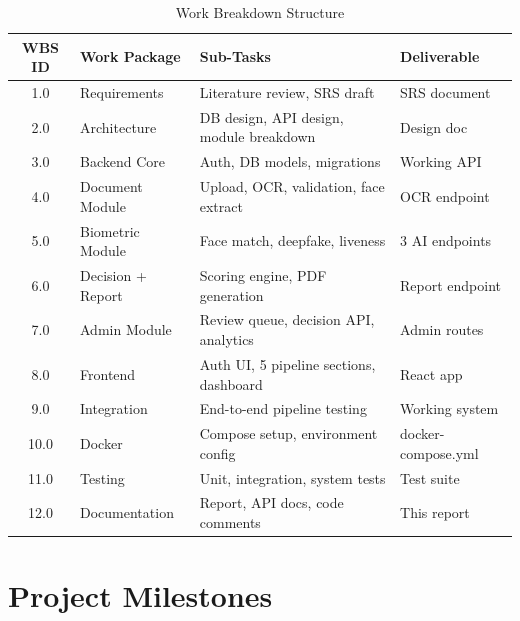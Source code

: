 \documentclass[12pt,a4paper]{report}
\begin{document}
\begin{table}[H]
\centering
\caption{Work Breakdown Structure}
\begin{tabular}{@{}clll@{}}
\toprule
\textbf{WBS ID} & \textbf{Work Package} & \textbf{Sub-Tasks} & \textbf{Deliverable} \\
\midrule
1.0 & Requirements & Literature review, SRS draft & SRS document \\
2.0 & Architecture & DB design, API design, module breakdown & Design doc \\
3.0 & Backend Core & Auth, DB models, migrations & Working API \\
4.0 & Document Module & Upload, OCR, validation, face extract & OCR endpoint \\
5.0 & Biometric Module & Face match, deepfake, liveness & 3 AI endpoints \\
6.0 & Decision + Report & Scoring engine, PDF generation & Report endpoint \\
7.0 & Admin Module & Review queue, decision API, analytics & Admin routes \\
8.0 & Frontend & Auth UI, 5 pipeline sections, dashboard & React app \\
9.0 & Integration & End-to-end pipeline testing & Working system \\
10.0 & Docker & Compose setup, environment config & docker-compose.yml \\
11.0 & Testing & Unit, integration, system tests & Test suite \\
12.0 & Documentation & Report, API docs, code comments & This report \\
\bottomrule
\end{tabular}
\end{table}

\section{Project Milestones}
\end{document}
